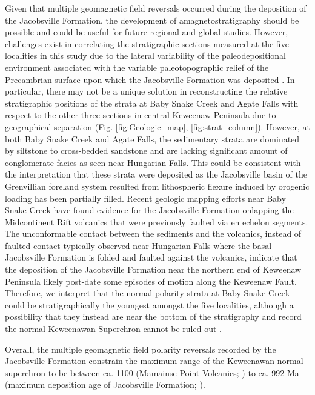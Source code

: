 \documentclass[draft]{agujournal2019}
\begin{document}
Given that multiple geomagnetic field reversals occurred during the deposition of the Jacobsville Formation, the development of amagnetostratigraphy should be possible and could be useful for future regional and global studies. However, challenges exist in correlating the stratigraphic sections measured at the five localities in this study due to the lateral variability of the paleodepositional environment associated with the variable paleotopographic relief of the Precambrian surface upon which the Jacobsville Formation was deposited \cite{Hamblin1958a, Kalliokoski1982a}. In particular, there may not be a unique solution in reconstructing the relative stratigraphic positions of the strata at Baby Snake Creek and Agate Falls with respect to the other three sections in central Keweenaw Peninsula due to geographical separation (Fig. \ref{fig:Geologic_map}, \ref{fig:strat_column}). However, at both Baby Snake Creek and Agate Falls, the sedimentary strata are dominated by siltstone to cross-bedded sandstone and are lacking significant amount of conglomerate facies as seen near Hungarian Falls. This could be consistent with the interpretation that these strata were deposited as the Jacobsville basin of the Grenvillian foreland system resulted from lithospheric flexure induced by orogenic loading has been partially filled. Recent geologic mapping efforts near Baby Snake Creek have found evidence for the Jacobsville Formation onlapping the Midcontinent Rift volcanics that were previously faulted via en echelon segments\cite{Tyrrell2019a, Mueller2021a}. The unconformable contact between the sediments and the volcanics, instead of faulted contact typically observed near Hungarian Falls where the basal Jacobsville Formation is folded and faulted against the volcanics, indicate that the deposition of the Jacobsville Formation near the northern end of Keweenaw Peninsula likely post-date some episodes of motion along the Keweenaw Fault. Therefore, we interpret that the normal-polarity strata at Baby Snake Creek could be stratigraphically the youngest amongst the five localities, although a possibility that they instead are near the bottom of the stratigraphy and record the normal Keweenawan Superchron cannot be ruled out \cite{Driscoll2016b}. 

Overall, the multiple geomagnetic field polarity reversals recorded by the Jacobsville Formation constrain the maximum range of the Keweenawan normal superchron \cite{Driscoll2016b} to be between ca. 1100 (Mamainse Point Volcanics; \cite{Swanson-Hysell2019a}) to ca. 992 Ma (maximum deposition age of Jacobsville Formation; \cite{Hodgin2022a}). 
\end{document}
